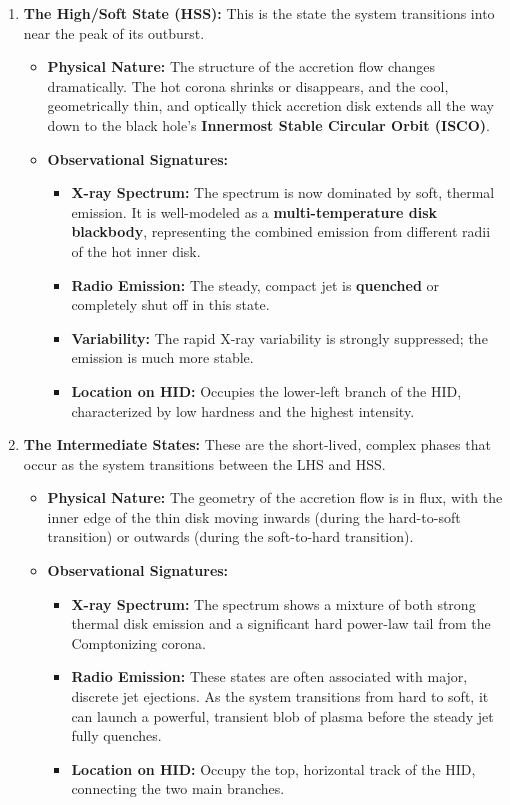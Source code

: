 \begin{enumerate}
    \item \textbf{The High/Soft State (HSS):} This is the state the system transitions into near the peak of its outburst.
    \begin{itemize}
        \item \textbf{Physical Nature:} The structure of the accretion flow changes dramatically. The hot corona shrinks or disappears, and the cool, geometrically thin, and optically thick accretion disk extends all the way down to the black hole's \textbf{Innermost Stable Circular Orbit (ISCO)}.
        \item \textbf{Observational Signatures:}
        \begin{itemize}
            \item \textbf{X-ray Spectrum:} The spectrum is now dominated by soft, thermal emission. It is well-modeled as a \textbf{multi-temperature disk blackbody}, representing the combined emission from different radii of the hot inner disk.
            \item \textbf{Radio Emission:} The steady, compact jet is \textbf{quenched} or completely shut off in this state.
            \item \textbf{Variability:} The rapid X-ray variability is strongly suppressed; the emission is much more stable.
            \item \textbf{Location on HID:} Occupies the lower-left branch of the HID, characterized by low hardness and the highest intensity.
        \end{itemize}
    \end{itemize}

    \item \textbf{The Intermediate States:} These are the short-lived, complex phases that occur as the system transitions between the LHS and HSS.
    \begin{itemize}
        \item \textbf{Physical Nature:} The geometry of the accretion flow is in flux, with the inner edge of the thin disk moving inwards (during the hard-to-soft transition) or outwards (during the soft-to-hard transition).
        \item \textbf{Observational Signatures:}
        \begin{itemize}
            \item \textbf{X-ray Spectrum:} The spectrum shows a mixture of both strong thermal disk emission and a significant hard power-law tail from the Comptonizing corona.
            \item \textbf{Radio Emission:} These states are often associated with major, discrete jet ejections. As the system transitions from hard to soft, it can launch a powerful, transient blob of plasma before the steady jet fully quenches.
            \item \textbf{Location on HID:} Occupy the top, horizontal track of the HID, connecting the two main branches.
        \end{itemize}
    \end{itemize}
\end{enumerate}
\vspace{10pt}
